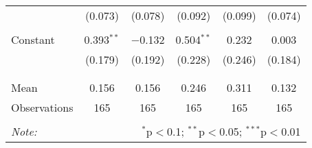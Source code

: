 \begin{tabular}{@{\extracolsep{5pt}}lccccc}
  & (0.073) & (0.078) & (0.092) & (0.099) & (0.074) \\ 
  & & & & & \\ 
 Constant & 0.393$^{**}$ & $-$0.132 & 0.504$^{**}$ & 0.232 & 0.003 \\ 
  & (0.179) & (0.192) & (0.228) & (0.246) & (0.184) \\ 
  & & & & & \\ 
\hline \\[-1.8ex] 
Mean & 0.156 & 0.156 & 0.246 & 0.311 & 0.132 \\ 
Observations & 165 & 165 & 165 & 165 & 165 \\ 
\hline 
\hline \\[-1.8ex] 
\textit{Note:}  & \multicolumn{5}{r}{$^{*}$p$<$0.1; $^{**}$p$<$0.05; $^{***}$p$<$0.01} \\ 
\end{tabular} 
